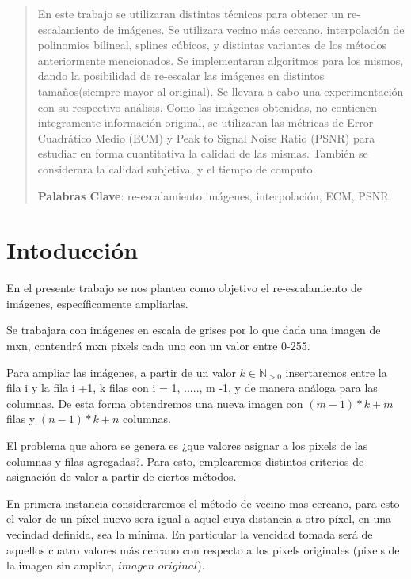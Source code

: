 \documentclass[a4paper]{article}
\newcounter{col}
\begin{document}
\setcounter{page}{1}


\begin{abstract}

En este trabajo se utilizaran distintas técnicas para obtener un re-escalamiento de imágenes. Se utilizara vecino más cercano, interpolación de polinomios bilineal, splines cúbicos, y distintas variantes de los métodos anteriormente mencionados. Se implementaran algoritmos para los mismos, dando la posibilidad de re-escalar las imágenes en distintos tamaños(siempre mayor al original). Se llevara a cabo una experimentación con su respectivo análisis. Como las imágenes obtenidas, no contienen integramente información original, se utilizaran las métricas de Error Cuadrático Medio (ECM) y Peak to Signal Noise Ratio (PSNR) para estudiar en forma cuantitativa la calidad de las mismas. También se considerara la calidad subjetiva, y el tiempo de computo. 

\textbf{Palabras Clave}: re-escalamiento imágenes, interpolación, ECM, PSNR

\end{abstract}

\newpage

\section{Intoducción}

En el presente trabajo se nos plantea como objetivo el re-escalamiento de imágenes, específicamente ampliarlas.

Se trabajara con imágenes en escala de grises por lo que dada una imagen de mxn, contendrá mxn pixels cada uno con un valor entre 0-255.

Para ampliar las imágenes, a partir de un valor $k \in \mathbb{N}_{>0}$ insertaremos entre la fila i y la fila i +1, k filas con i = 1, ....., m -1, y de manera análoga para las columnas. De esta forma obtendremos una nueva imagen con $(m -1)*k + m$ filas y $(n -1)*k + n$ columnas.

El problema que ahora se genera es ¿que valores asignar a los pixels de las columnas y filas agregadas?. Para esto, emplearemos distintos criterios de asignación de valor a partir de ciertos métodos.

En primera instancia consideraremos el método de vecino mas cercano, para esto el valor de un píxel nuevo sera igual a aquel cuya distancia a otro píxel, en una vecindad definida, sea la mínima. En particular la vencidad tomada será de aquellos cuatro valores más cercano con respecto a los pixels originales (pixels de la imagen sin ampliar, $imagen$ $original$). 
\end{document}
